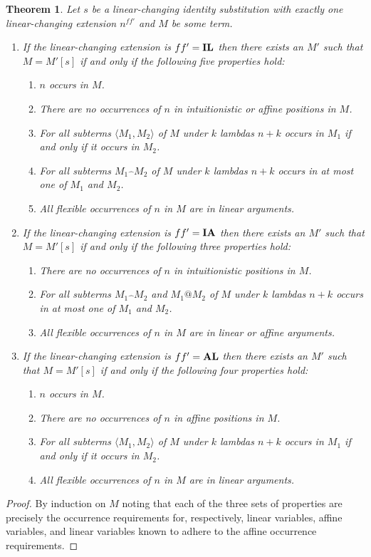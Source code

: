 \documentclass{eptcs}
\makeatletter
\newcommand{\lhat}[1]{\widehat{\;#1\;}}
\newcommand\affapp{{@}}
\newcommand\fI{\textup{$\mathbf{I}$}}
\newcommand\fA{\textup{$\mathbf{A}$}}
\newcommand\fL{\textup{$\mathbf{L}$}}
\newtheorem{thm}{Theorem}[section]
\theoremstyle{definition}
\makeatother
\begin{document}
\begin{thm}\label{thm:linprune}
Let $s$ be a linear-changing identity substitution with exactly one
linear-changing extension $n^{ff'}$ and $M$ be some term.
\begin{enumerate}
\item
If the linear-changing extension is $ff'=\fI\fL$
then there exists an $M'$ such that $M=M'[s]$ if
and only if the following five properties hold:
\begin{enumerate}
\item
$n$ occurs in $M$.
\item
There are no occurrences of $n$ in intuitionistic or affine positions in $M$.
\item
For all subterms $\langle M_1,M_2\rangle$ of $M$ under $k$ lambdas
$n+k$ occurs in $M_1$ if and only if it occurs in $M_2$.
\item
For all subterms $M_1\lhat{}M_2$ of $M$ under $k$ lambdas
$n+k$ occurs in at most one of $M_1$ and $M_2$.
\item
All flexible occurrences of $n$ in $M$ are in linear arguments.
\end{enumerate}
\item
If the linear-changing extension is $ff'=\fI\fA$
then there exists an $M'$ such that $M=M'[s]$ if
and only if the following three properties hold:
\begin{enumerate}
\item
There are no occurrences of $n$ in intuitionistic positions in $M$.
\item
For all subterms $M_1\lhat{}M_2$ and $M_1\affapp M_2$
of $M$ under $k$ lambdas
$n+k$ occurs in at most one of $M_1$ and $M_2$.
\item
All flexible occurrences of $n$ in $M$ are in linear or affine arguments.
\end{enumerate}
\item
If the linear-changing extension is $ff'=\fA\fL$
then there exists an $M'$ such that $M=M'[s]$ if
and only if the following four properties hold:
\begin{enumerate}
\item
$n$ occurs in $M$.
\item
There are no occurrences of $n$ in affine positions in $M$.
\item
For all subterms $\langle M_1,M_2\rangle$ of $M$ under $k$ lambdas
$n+k$ occurs in $M_1$ if and only if it occurs in $M_2$.
\item
All flexible occurrences of $n$ in $M$ are in linear arguments.
\end{enumerate}
\end{enumerate}
\end{thm}
\begin{proof}
By induction on $M$ noting that each of the three sets of
properties are precisely the occurrence requirements for, respectively,
linear variables, affine variables, and linear variables known to adhere
to the affine occurrence requirements.
\end{proof}
\end{document}
